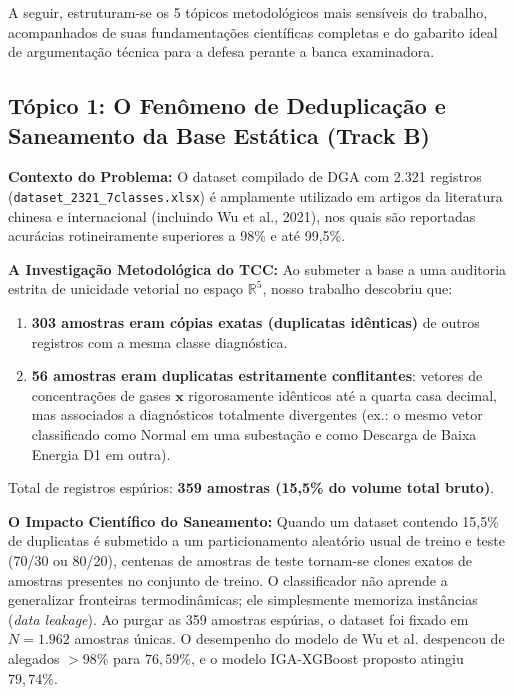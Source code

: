 \documentclass[10pt,a4paper]{article}
\begin{document}
A seguir, estruturam-se os 5 tópicos metodológicos mais sensíveis do trabalho, acompanhados de suas fundamentações científicas completas e do gabarito ideal de argumentação técnica para a defesa perante a banca examinadora.

\subsection{Tópico 1: O Fenômeno de Deduplicação e Saneamento da Base Estática (Track B)}

\begin{defesabox}
\textbf{Contexto do Problema:} O dataset compilado de DGA com 2.321 registros (\texttt{dataset\_2321\_7classes.xlsx}) é amplamente utilizado em artigos da literatura chinesa e internacional (incluindo Wu et al., 2021), nos quais são reportadas acurácias rotineiramente superiores a 98\% e até 99,5\%.

\textbf{A Investigação Metodológica do TCC:}
Ao submeter a base a uma auditoria estrita de unicidade vetorial no espaço $\mathbb{R}^5$, nosso trabalho descobriu que:
\begin{enumerate}[leftmargin=*,itemsep=1pt]
  \item \textbf{303 amostras eram cópias exatas (duplicatas idênticas)} de outros registros com a mesma classe diagnóstica.
  \item \textbf{56 amostras eram duplicatas estritamente conflitantes}: vetores de concentrações de gases $\mathbf{x}$ rigorosamente idênticos até a quarta casa decimal, mas associados a diagnósticos totalmente divergentes (ex.: o mesmo vetor classificado como Normal em uma subestação e como Descarga de Baixa Energia D1 em outra).
\end{enumerate}
Total de registros espúrios: \textbf{359 amostras (15,5\% do volume total bruto)}.

\textbf{O Impacto Científico do Saneamento:}
Quando um dataset contendo 15,5\% de duplicatas é submetido a um particionamento aleatório usual de treino e teste (70/30 ou 80/20), centenas de amostras de teste tornam-se clones exatos de amostras presentes no conjunto de treino. O classificador não aprende a generalizar fronteiras termodinâmicas; ele simplesmente memoriza instâncias (\textit{data leakage}). Ao purgar as 359 amostras espúrias, o dataset foi fixado em $N=1.962$ amostras únicas. O desempenho do modelo de Wu et al. despencou de alegados $>98\%$ para $76,59\%$, e o modelo IGA-XGBoost proposto atingiu $79,74\%$.
\end{defesabox}
\end{document}
